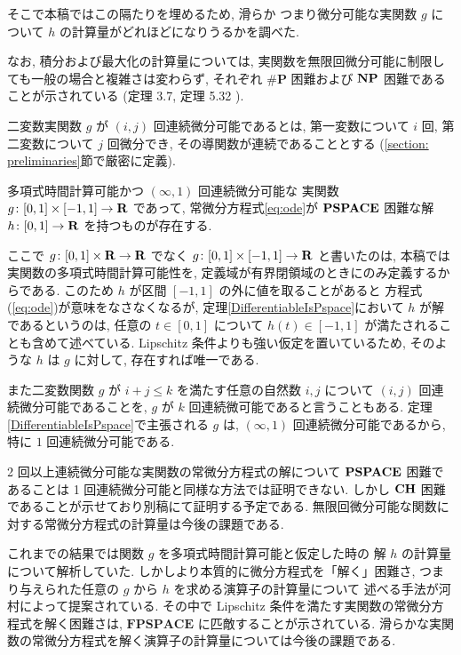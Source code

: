 そこで本稿ではこの隔たりを埋めるため, 滑らか
つまり微分可能な実関数 $g$ について $h$ の計算量がどれほどになりうるかを調べた.

なお, 積分および最大化の計算量については,
実関数を無限回微分可能に制限しても一般の場合と複雑さは変わらず,
それぞれ $\mathbf{\#P}$ 困難および $\mathbf{NP}$ 困難であることが示されている
(定理 3.7, 定理 5.32 \cite{ko1991complexity}).


二変数実関数 $g$ が $(i, j)$ 回連続微分可能であるとは,
第一変数について $i$ 回, 第二変数について $j$ 回微分でき, 
その導関数が連続であることとする
(\ref{section: preliminaries}節で厳密に定義).

 \begin{theorem}
  \label{DifferentiableIsPspace}
  多項式時間計算可能かつ $(\infty, 1)$ 回連続微分可能な
  実関数 $g \colon [0,1] \times [-1,1] \to \mathbf R$ であって, 
  常微分方程式\eqref{eq:ode}が
  $\mathbf{PSPACE}$ 困難な解 $h \colon [0, 1] \to \mathbf R$ を持つものが存在する.
 \end{theorem}

ここで $g \colon [0,1] \times \mathbf R \to \mathbf R$ でなく
$g \colon [0,1] \times [-1, 1] \to \mathbf R$ と書いたのは, 
本稿では実関数の多項式時間計算可能性を, 
定義域が有界閉領域のときにのみ定義するからである. 
このため $h$ が区間 $[-1, 1]$ の外に値を取ることがあると
方程式(\ref{eq:ode})が意味をなさなくなるが, 
定理\ref{DifferentiableIsPspace}において $h$ が解であるというのは, 
任意の $t \in [0, 1]$ について $h (t) \in [-1, 1]$ が満たされることも含めて述べている.
Lipschitz 条件よりも強い仮定を置いているため, 
そのような $h$ は $g$ に対して, 存在すれば唯一である. 

また二変数関数 $g$ が
$i+j \le k$ を満たす任意の自然数 $i,j$ について
$(i,j)$ 回連続微分可能であることを, 
$g$ が $k$ 回連続微可能であると言うこともある.
定理\ref{DifferentiableIsPspace}で主張される $g$ は, 
$(\infty, 1)$ 回連続微分可能であるから, 
特に $1$ 回連続微分可能である. 

2 回以上連続微分可能な実関数の常微分方程式の解について
$\mathbf{PSPACE}$ 困難であることは 1 回連続微分可能と同様な方法では証明できない.
しかし $\mathbf{CH}$ 困難であることが示せており別稿にて証明する予定である.
無限回微分可能な関数に対する常微分方程式の計算量は今後の課題である.

これまでの結果では関数 $g$ を多項式時間計算可能と仮定した時の
解 $h$ の計算量について解析していた.
しかしより本質的に微分方程式を「解く」困難さ, 
つまり与えられた任意の $g$ から $h$ を求める演算子の計算量について
述べる手法が河村によって提案されている\cite{kawamura2010operators}.
その中で Lipschitz 条件を満たす実関数の常微分方程式を解く困難さは,
$\mathbf{FPSPACE}$ に匹敵することが示されている.
滑らかな実関数の常微分方程式を解く演算子の計算量については今後の課題である.


